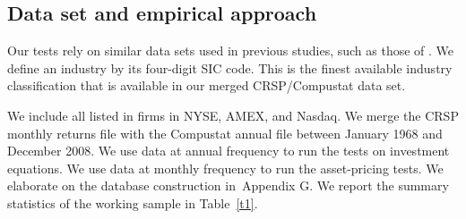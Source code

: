 \documentclass[nogrid,nosurname,sort&compress]{RFS}
\begin{document}
\subsection{Data set and empirical approach}

Our tests rely on similar data sets used in previous studies, such as those of \cite{hoberg}. We
define an industry by its four-digit SIC code. This is the finest available industry
classification that is available in our merged CRSP/Compustat data set.

We include all listed in firms in NYSE, AMEX, and Nasdaq. We merge the CRSP monthly returns file
with the Compustat annual file between January 1968 and December 2008. We use data at annual
frequency to run the tests on investment equations. We use data at monthly frequency to run the
asset-pricing tests. We elaborate on the database construction in\ Appendix G. We report the
summary statistics of the working sample in Table~\ref{t1}.



\end{document}
